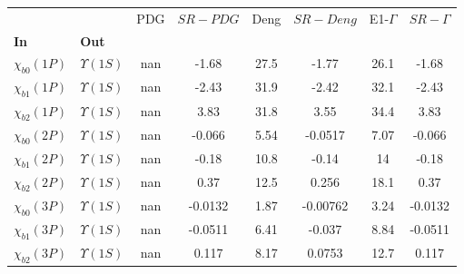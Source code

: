 \begin{tabular}{l|l|c|c|c|c|c|c}
\toprule
                &                &  PDG & $SR-PDG$ &  Deng & $SR-Deng$ &  E1-$\Gamma$ & $SR-\Gamma$ \\
\textbf{In} & \textbf{Out} &      &          &       &           &              &             \\
\midrule
\textbf{$\chi_{b0}(1P)$} & \textbf{$\Upsilon(1S)$} &  nan &    -1.68 &  27.5 &     -1.77 &         26.1 &       -1.68 \\
\textbf{$\chi_{b1}(1P)$} & \textbf{$\Upsilon(1S)$} &  nan &    -2.43 &  31.9 &     -2.42 &         32.1 &       -2.43 \\
\textbf{$\chi_{b2}(1P)$} & \textbf{$\Upsilon(1S)$} &  nan &     3.83 &  31.8 &      3.55 &         34.4 &        3.83 \\
\textbf{$\chi_{b0}(2P)$} & \textbf{$\Upsilon(1S)$} &  nan &   -0.066 &  5.54 &   -0.0517 &         7.07 &      -0.066 \\
\textbf{$\chi_{b1}(2P)$} & \textbf{$\Upsilon(1S)$} &  nan &    -0.18 &  10.8 &     -0.14 &           14 &       -0.18 \\
\textbf{$\chi_{b2}(2P)$} & \textbf{$\Upsilon(1S)$} &  nan &     0.37 &  12.5 &     0.256 &         18.1 &        0.37 \\
\textbf{$\chi_{b0}(3P)$} & \textbf{$\Upsilon(1S)$} &  nan &  -0.0132 &  1.87 &  -0.00762 &         3.24 &     -0.0132 \\
\textbf{$\chi_{b1}(3P)$} & \textbf{$\Upsilon(1S)$} &  nan &  -0.0511 &  6.41 &    -0.037 &         8.84 &     -0.0511 \\
\textbf{$\chi_{b2}(3P)$} & \textbf{$\Upsilon(1S)$} &  nan &    0.117 &  8.17 &    0.0753 &         12.7 &       0.117 \\
\bottomrule
\end{tabular}

